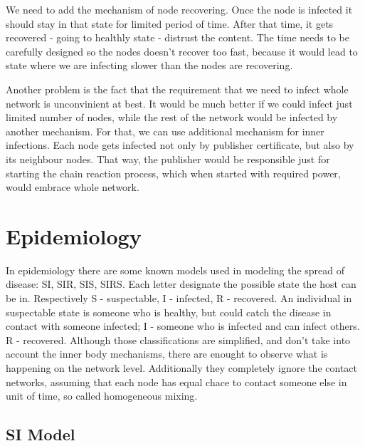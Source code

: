 \documentclass[nostrict]{szablonPG}
\begin{document}
We need to add the mechanism of node recovering. Once the node is infected it should stay in that state for limited period of time. After that time, it gets recovered - going to healthly state - distrust the content. The time needs to be carefully designed so the nodes doesn't recover too fast, because it would lead to state where we are infecting slower than the nodes are recovering. 

Another problem is the fact that the requirement that we need to infect whole network is unconvinient at best. It would be much better if we could infect just limited number of nodes, while the rest of the network would be infected by another mechanism.
For that, we can use additional mechanism for inner infections. Each node gets infected not only by publisher certificate, but also by its neighbour nodes. That way, the publisher would be responsible just for starting the chain reaction process, which when started with required power, would embrace whole network. 

\section{Epidemiology}
In epidemiology there are some known models used in modeling the spread of disease: SI, SIR, SIS, SIRS. Each letter designate the possible state the host can be in. Respectively S - suspectable, I - infected, R - recovered. An individual in suspectable state is someone who is healthy, but could catch the disease in contact with someone infected; I - someone who is infected and can infect others. R - recovered. Although those classifications are simplified, and don't take into account the inner body mechanisms, there are enought to observe what is happening on the network level. Additionally they completely ignore the contact networks, assuming that each node has equal chace to contact someone else in unit of time, so called homogeneous mixing.

\subsection{SI Model}
\end{document}
